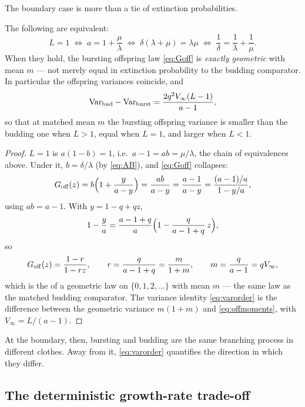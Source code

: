 The boundary case is more than a tie of extinction probabilities.

\begin{proposition}
\label{prop:L1}
The following are equivalent:
\begin{equation}
L=1
\;\Longleftrightarrow\;
a=1+\frac{\mu}{\lambda}
\;\Longleftrightarrow\;
\delta(\lambda+\mu)=\lambda\mu
\;\Longleftrightarrow\;
\frac{1}{\delta}=\frac{1}{\lambda}+\frac{1}{\mu}.
\end{equation}
When they hold, the bursting offspring law \eqref{eq:Goff} is
\emph{exactly geometric} with mean $m$ --- not merely equal in extinction
probability to the budding comparator. In particular the offspring
variances coincide, and
\begin{equation}
\mathrm{Var}_{\rm bud}-\mathrm{Var}_{\rm burst}
=\frac{2q^2V_\infty(L-1)}{a-1},
\label{eq:varorder}
\end{equation}
so that at matched mean $m$ the bursting offspring variance is smaller
than the budding one when $L>1$, equal when $L=1$, and larger when $L<1$.
\end{proposition}

\begin{proof}
$L=1$ is $a(1-b)=1$, i.e.\ $a-1=ab=\mu/\lambda$, the chain of equivalences
above. Under it, $b=\delta/\lambda$ (by \eqref{eq:AB}), and \eqref{eq:Goff}
collapses:
$$
G_{\rm off}(z)=b\Bigl(1+\frac{y}{a-y}\Bigr)=\frac{ab}{a-y}
=\frac{a-1}{a-y}
=\frac{(a-1)/a}{1-y/a},
$$
using $ab=a-1$. With $y=1-q+qz$,
$$
1-\frac{y}{a}=\frac{a-1+q}{a}\Bigl(1-\frac{q}{a-1+q}\,z\Bigr),
$$
so
$$
G_{\rm off}(z)=\frac{1-r}{1-rz},
\qquad
r=\frac{q}{a-1+q}=\frac{m}{1+m},
\qquad m=\frac{q}{a-1}=qV_\infty,
$$
which is the \pgf{} of a geometric law on $\{0,1,2,\ldots\}$ with mean $m$
--- the same law as the matched budding comparator. The variance identity
\eqref{eq:varorder} is the difference between the geometric variance
$m(1+m)$ and \eqref{eq:offmoments}, with $V_\infty=L/(a-1)$.
\end{proof}

At the boundary, then, bursting and budding are the same branching process
in different clothes. Away from it, \eqref{eq:varorder} quantifies the
direction in which they differ.

\subsection{The deterministic growth-rate trade-off}
\label{sec:r-tradeoff}

